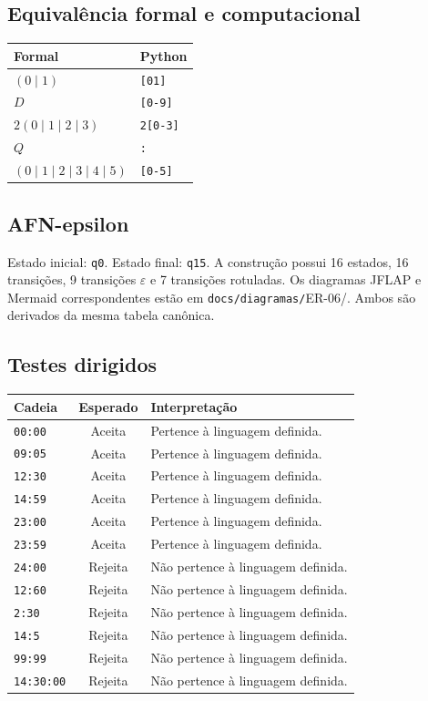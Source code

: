 \documentclass[12pt,a4paper,oneside]{report}
\begin{document}
\subsection{Equivalência formal e computacional}
\begin{center}
\small
\begin{tabular}{|p{}|p{}|}
\toprule
Formal & Python \\
\midrule
$(0\mid1)$ & \texttt{[01]} \\
$D$ & \texttt{[0-9]} \\
$2(0\mid1\mid2\mid3)$ & \texttt{2[0-3]} \\
$Q$ & \texttt{:} \\
$(0\mid1\mid2\mid3\mid4\mid5)$ & \texttt{[0-5]} \\
\bottomrule
\end{tabular}
\end{center}
\subsection{AFN-epsilon}
Estado inicial: \texttt{q0}. Estado final: \texttt{q15}. A construção possui 16 estados, 16 transições, 9 transições $\varepsilon$ e 7 transições rotuladas.
Os diagramas JFLAP e Mermaid correspondentes estão em \texttt{docs/diagramas/}ER-06/. Ambos são derivados da mesma tabela canônica.
\subsection{Testes dirigidos}
\begin{center}
\small
\begin{tabular}{|p{}|c|p{}|}
\toprule
Cadeia & Esperado & Interpretação \\
\midrule
\texttt{00:00} & Aceita & Pertence à linguagem definida. \\
\texttt{09:05} & Aceita & Pertence à linguagem definida. \\
\texttt{12:30} & Aceita & Pertence à linguagem definida. \\
\texttt{14:59} & Aceita & Pertence à linguagem definida. \\
\texttt{23:00} & Aceita & Pertence à linguagem definida. \\
\texttt{23:59} & Aceita & Pertence à linguagem definida. \\
\texttt{24:00} & Rejeita & Não pertence à linguagem definida. \\
\texttt{12:60} & Rejeita & Não pertence à linguagem definida. \\
\texttt{2:30} & Rejeita & Não pertence à linguagem definida. \\
\texttt{14:5} & Rejeita & Não pertence à linguagem definida. \\
\texttt{99:99} & Rejeita & Não pertence à linguagem definida. \\
\texttt{14:30:00} & Rejeita & Não pertence à linguagem definida. \\
\bottomrule
\end{tabular}
\end{center}
\end{document}
